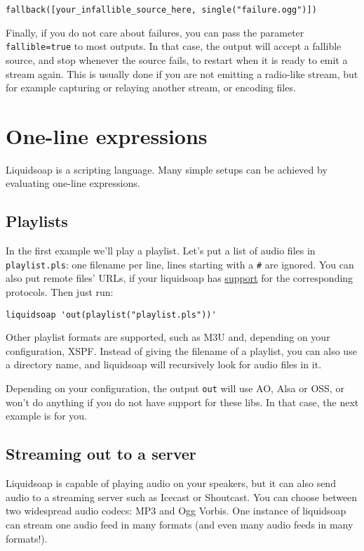 \begin{verbatim}
fallback([your_infallible_source_here, single("failure.ogg")])
\end{verbatim}
Finally, if you do not care about failures, you can pass the parameter
\verb+fallible=true+ to most outputs. In that case, the output
will accept a fallible source, and stop whenever the source fails,
to restart when it is ready to emit a stream again.
This is usually done if you are not emitting a radio-like stream,
but for example capturing or relaying another stream,
or encoding files.

\section{One-line expressions}
Liquidsoap is a scripting language. Many simple setups can be achieved by
evaluating one-line expressions.

\subsection{Playlists}
In the first example we'll play a playlist. Let's put a list of audio files in
\verb+playlist.pls+: one filename per line, lines starting with a \verb+#+ are
ignored. You can also put remote files' URLs, if your liquidsoap has
\href{help.html#plugins}{support} for the corresponding protocols.  Then just
run:

\begin{verbatim}
liquidsoap 'out(playlist("playlist.pls"))'
\end{verbatim}
Other playlist formats are supported, such as M3U and, depending on your
configuration, XSPF. Instead of giving the filename of a playlist, you can also
use a directory name, and liquidsoap will recursively look for audio files in
it.

Depending on your configuration, the output \verb+out+ will use AO, Alsa or OSS,
or won't do anything if you do not have support for these libs. In that case,
the next example is for you.

\subsection{Streaming out to a server}
Liquidsoap is capable of playing audio on your speakers, but it can also send
audio to a streaming server such as Icecast or Shoutcast. You can choose between
two widespread audio codecs: MP3 and Ogg Vorbis. One instance of liquidsoap can
stream one audio feed in many formats (and even many audio feeds in many
formats!).


